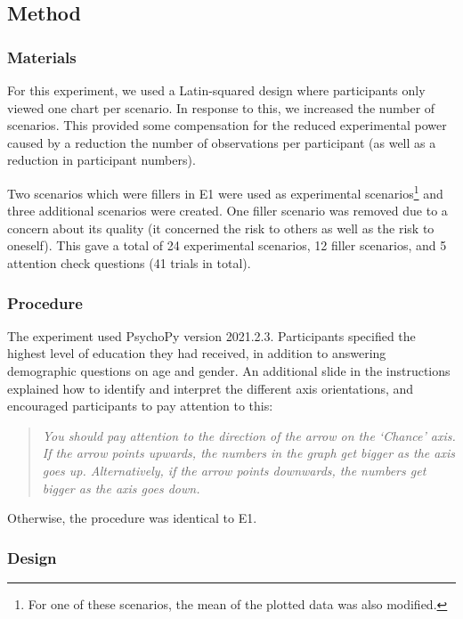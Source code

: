 \documentclass[journal]{vgtc}                %
\begin{document}
\hypertarget{method}{%
\subsection{Method}\label{method}}

\hypertarget{materials-1}{%
\subsubsection{Materials}\label{materials-1}}

For this experiment, we used a Latin-squared design where participants
only viewed one chart per scenario. In response to this, we increased
the number of scenarios. This provided some compensation for the reduced
experimental power caused by a reduction the number of observations per
participant (as well as a reduction in participant numbers).

Two scenarios which were fillers in E1 were used as experimental
scenarios\footnote{For one of these scenarios, the mean of the plotted data was also
  modified.} and three additional scenarios were created. One filler
scenario was removed due to a concern about its quality (it concerned
the risk to others as well as the risk to oneself). This gave a total of
24 experimental scenarios, 12 filler scenarios, and 5 attention check
questions (41 trials in total).

\hypertarget{procedure-1}{%
\subsubsection{Procedure}\label{procedure-1}}

The experiment used PsychoPy version 2021.2.3. Participants specified the highest level of education they had received,
in addition to answering demographic questions on age and gender. An
additional slide in the instructions explained how to identify and
interpret the different axis orientations, and encouraged participants
to pay attention to this:

\begin{quote}
\emph{You should pay attention to the direction of the arrow on the
`Chance' axis. If the arrow points upwards, the numbers in the graph
get bigger as the axis goes up. Alternatively, if the arrow points
downwards, the numbers get bigger as the axis goes down.}
\end{quote}

Otherwise, the procedure was identical to E1.

\hypertarget{design-1}{%
\subsubsection{Design}\label{design-1}}
\end{document}
